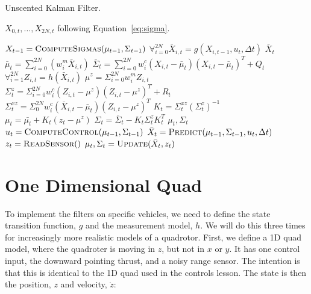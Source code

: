 \documentclass{article}
\begin{document}
\begin{algorithm}
  \caption{Unscented Kalman Filter.  \label{alg:ukf}}  
  \begin{algorithmic}[1]

    \State \Return  $X_{0,t}, \dots, X_{2N,t}$ following Equation~\ref{eq:sigma}.
    \EndFunction
      
    \State $X_{t-1} = \textsc{ComputeSigmas}(\mu_{t-1}, \Sigma_{t-1})$
    \State $\forall_{i=0}^{2N} \bar{X}_{i,t} = g(X_{i,t-1}, u_t, \Delta t)$
    \State \Return $\bar{X}_t$
    \EndFunction
    \State $\bar{\mu}_t = \sum_{i=0}^{2N}(w_i^m \bar{X}_{i,t})$
    \State $\bar{\Sigma}_t = \sum_{i=0}^{2N} w_i^c (X_{i,t} - \bar{\mu}_t)(X_{i,t} - \bar{\mu}_t)^T+Q_t$
    \State $\forall_{i=1}^{2N} Z_{i,t} = h(\bar{X}_{i,t})$
    \State $\mu^z = \Sigma_{i=0}^{2N} w_i^m Z_{i,t}$
    \State $\Sigma_t^z = \Sigma_{i=0}^{2N} w_i^c (Z_{i,t} - \mu^z)(Z_{i,t} - \mu^z)^T+R_t$
    \State $\Sigma_t^{xz} = \Sigma_{0}^{2N} w_i^c (\bar{X}_{i,t} - \bar{\mu}_t)(Z_{i,t} - \mu^z)^T$
    \State $K_t = \Sigma_t^{xz} (\Sigma_t^z)^{-1}$
    \State $\mu_t = \bar{\mu_t} + K_t (z_t - \mu^z)$
    \State $\Sigma_t = \bar{\Sigma}_t - K_t \Sigma_t^z K_t^T$
    \State \Return $\mu_t, \Sigma_t$
    \EndFunction
    \State $u_t = \textsc{ComputeControl}(\mu_{t-1}, \Sigma_{t-1})$
    \State $\bar{X}_t = \textsc{Predict}(\mu_{t-1}, \Sigma_{t-1}, u_t, \Delta t)$
    \State $z_t = \textsc{ReadSensor}()$
    \State $\mu_{t}, \Sigma_t = \textsc{Update}(\bar{X}_t, z_t)$
    \EndFunction    
  \end{algorithmic}
\end{algorithm}

\section{One Dimensional Quad}

To implement the filters on specific vehicles, we need to define the
state transition function, $g$ and the measurement model, $h$.  We
will do this three times for increasingly more realistic models of a
quadrotor.  First, we define a 1D quad model, where the quadroter is
moving in $z$, but not in $x$ or $y$.  It has one control input, the
downward pointing thrust, and a noisy range sensor.  The intention is
that this is identical to the 1D quad used in the controls lesson.
The state is then the position, $z$ and velocity, $\dot{z}$:
\end{document}

